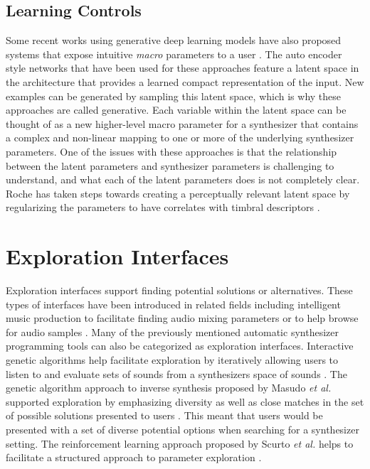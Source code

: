 \subsection{Learning Controls}
Some recent works using generative deep learning models have also proposed systems that expose intuitive \textit{macro} parameters to a user \cite{esling2020flow, roche2021make, le2021improving}. The auto encoder style networks that have been used for these approaches feature a latent space in the architecture that provides a learned compact representation of the input. New examples can be generated by sampling this latent space, which is why these approaches are called generative. Each variable within the latent space can be thought of as a new higher-level macro parameter for a synthesizer that contains a complex and non-linear mapping to one or more of the underlying synthesizer parameters. One of the issues with these approaches is that the relationship between the latent parameters and synthesizer parameters is challenging to understand, and what each of the latent parameters does is not completely clear. Roche has taken steps towards creating a perceptually relevant latent space by regularizing the parameters to have correlates with timbral descriptors \cite{roche2021make}.

\section{Exploration Interfaces}
Exploration interfaces support finding potential solutions or alternatives. These types of interfaces have been introduced in related fields including intelligent music production to facilitate finding audio mixing parameters \cite{cartwright2014mixploration} or to help browse for audio samples \cite{fried2014audioquilt, shier2021manifold, turquois2016exploring}. Many of the previously mentioned automatic synthesizer programming tools can also be categorized as exploration interfaces. Interactive genetic algorithms help facilitate exploration by iteratively allowing users to listen to and evaluate sets of sounds from a synthesizers space of sounds \cite{johnson1999exploring, dahlstedt2001creating, yee2016use}. The genetic algorithm approach to inverse synthesis proposed by Masudo \textit{et al.} supported exploration by emphasizing diversity as well as close matches in the set of possible solutions presented to users \cite{masudo2021quality}. This meant that users would be presented with a set of diverse potential options when searching for a synthesizer setting. The reinforcement learning approach proposed by Scurto \textit{et al.} helps to facilitate a structured approach to parameter exploration \cite{scurto2021designing}. 

